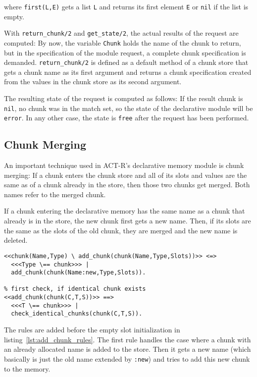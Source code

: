 where \lstinline|first(L,E)| gets a list \lstinline|L| and returns its first element \lstinline|E| or \lstinline|nil| if the list is empty. 

With \lstinline|return_chunk/2| and \lstinline|get_state/2|, the actual results of the request are computed: By now, the variable \lstinline|Chunk| holds the name of the chunk to return, but in the specification of the module request, a complete chunk specification is demanded. \lstinline|return_chunk/2| is defined as a default method of a chunk store that gets a chunk name as its first argument and returns a chunk specification created from the values in the chunk store as its second argument.

The resulting state of the request is computed as follows: If the result chunk is \lstinline|nil|, no chunk was in the match set, so the state of the declarative module will be \lstinline|error|. In any other case, the state is \lstinline|free| after the request has been performed.

\subsection{Chunk Merging}

An important technique used in ACT-R's declarative memory module is chunk merging: If a chunk enters the chunk store and all of its slots and values are the same as of a chunk already in the store, then those two chunks get merged. Both names refer to the merged chunk.

If a chunk entering the declarative memory has the same name as a chunk that already is in the store, the new chunk first gets a new name. Then, if its slots are the same as the slots of the old chunk, they are merged and the new name is deleted.

\begin{lstlisting}
<<chunk(Name,Type) \ add_chunk(chunk(Name,Type,Slots))>> <=>
  <<<Type \== chunk>>> |
  add_chunk(chunk(Name:new,Type,Slots)).

% first check, if identical chunk exists
<<add_chunk(chunk(C,T,S))>> ==> 
  <<<T \== chunk>>> | 
  check_identical_chunks(chunk(C,T,S)).
\end{lstlisting}

The rules are added before the empty slot initialization in listing~\ref{lst:add_chunk_rules}. The first rule handles the case where a chunk with an already allocated name is added to the store. Then it gets a new name (which basically is just the old name extended by \lstinline|:new|) and tries to add this new chunk to the memory. 

